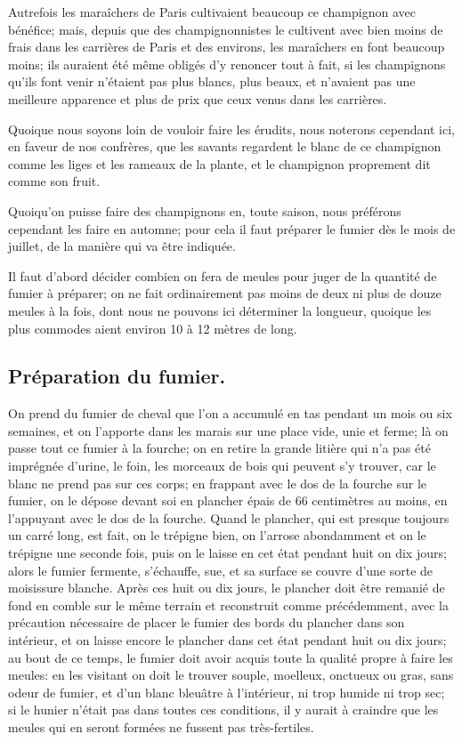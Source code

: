 \documentclass[10pt,a4paper]{book}
\begin{document}
Autrefois les maraîchers de Paris cultivaient beaucoup ce champignon avec bénéfice; mais, depuis que des champignonnistes le cultivent avec bien moins de frais dans les carrières de Paris et des environs, les maraîchers en font beaucoup moins; ils auraient été même obligés d'y renoncer tout à fait, si les champignons qu'ils font venir n'étaient pas plus blancs, plus beaux, et n'avaient pas une meilleure apparence et plus de prix que ceux venus dans les carrières.

Quoique nous soyons loin de vouloir faire les érudits, nous noterons cependant ici, en faveur de nos confrères, que les savants regardent le blanc de ce champignon comme les liges et les rameaux de la plante, et le champignon proprement dit comme son fruit.

Quoiqu'on puisse faire des champignons en, toute saison, nous préférons cependant les faire en automne; pour cela il faut préparer le fumier dès le mois de juillet, de la manière qui va être indiquée.

Il faut d'abord décider combien on fera de meules pour juger de la quantité de fumier à préparer; on ne fait ordinairement pas moins de deux ni plus de douze meules à la fois, dont nous ne pouvons ici déterminer la longueur, quoique les plus commodes aient environ 10 à 12 mètres de long.

\subsection{Préparation du fumier.}

On prend du fumier de cheval que l'on a accumulé en tas pendant un mois ou six semaines, et on l'apporte dans les marais sur une place vide, unie et ferme; là on passe tout ce fumier à la fourche; on en retire la grande litière qui n'a pas été imprégnée d'urine, le foin, les morceaux de bois qui peuvent s'y trouver, car le blanc ne prend pas sur ces corps; en frappant avec le dos de la fourche sur le fumier, on le dépose devant soi en plancher épais de 66 centimètres au moins, en l'appuyant avec le dos de la fourche. Quand le plancher, qui est presque toujours un carré long, est fait, on le trépigne bien, on l'arrose abondamment et on le trépigne une seconde fois, puis on le laisse en cet état pendant huit on dix jours; alors le fumier fermente, s'échauffe, sue, et sa surface se couvre d'une sorte de moisissure blanche. Après ces huit ou dix jours, le plancher doit être remanié de fond en comble sur le même terrain et reconstruit comme précédemment, avec la précaution nécessaire de placer le fumier des bords du plancher dans son intérieur, et on laisse encore le plancher dans cet état pendant huit ou dix jours; au bout de ce temps, le fumier doit avoir acquis toute la qualité propre à faire les meules: en les visitant on doit le trouver souple, moelleux, onctueux ou gras, sans odeur de fumier, et d'un blanc bleuâtre à l'intérieur, ni trop humide ni trop sec; si le hunier n'était pas dans toutes ces conditions, il y aurait à craindre que les meules qui en seront formées ne fussent pas très-fertiles.
\end{document}
